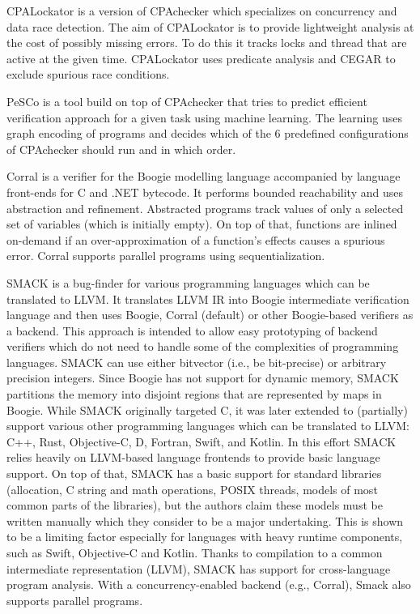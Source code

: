CPALockator  is a version of CPAchecker which specializes on concurrency and data race detection.
The aim of CPALockator is to provide lightweight analysis at the cost of possibly missing errors.
To do this it tracks locks and thread that are active at the given time.
CPALockator uses predicate analysis and CEGAR to exclude spurious race conditions.

PeSCo  is a tool build on top of CPAchecker that tries to predict efficient verification approach for a given task using machine learning.
The learning uses graph encoding of programs and decides which of the 6 predefined configurations of CPAchecker should run and in which order.

Corral  is a verifier for the Boogie modelling language accompanied by language front-ends for C and .NET bytecode.
It performs bounded reachability and uses abstraction and refinement.
Abstracted programs track values of only a selected set of variables (which is initially empty).
On top of that, functions are inlined on-demand if an over-approximation of a function's effects causes a spurious error.
Corral supports parallel programs using sequentialization.

SMACK  is a bug-finder for various programming languages which can be translated to LLVM.
It translates LLVM IR into Boogie intermediate verification language and then uses Boogie, Corral (default) or other Boogie-based verifiers as a backend.
This approach is intended to allow easy prototyping of backend verifiers which do not need to handle some of the complexities of programming languages.
SMACK can use either bitvector (i.e., be bit-precise) or arbitrary precision integers.
Since Boogie has not support for dynamic memory, SMACK partitions the memory into disjoint regions that are represented by maps in Boogie.
While SMACK originally targeted C, it was later extended to (partially) support various other programming languages which can be translated to LLVM: C++, Rust, Objective-C, D, Fortran, Swift, and Kotlin.
In this effort SMACK relies heavily on LLVM-based language frontends to provide basic language support.
On top of that, SMACK has a basic support for standard libraries (allocation, C string and math operations, POSIX threads, models of most common parts of the libraries), but the authors claim these models must be written manually which they consider to be a major undertaking.
This is shown to be a limiting factor especially for languages with heavy runtime components, such as Swift, Objective-C and Kotlin.
Thanks to compilation to a common intermediate representation (LLVM), SMACK has support for cross-language program analysis.
With a concurrency-enabled backend (e.g., Corral), Smack also supports parallel programs.

